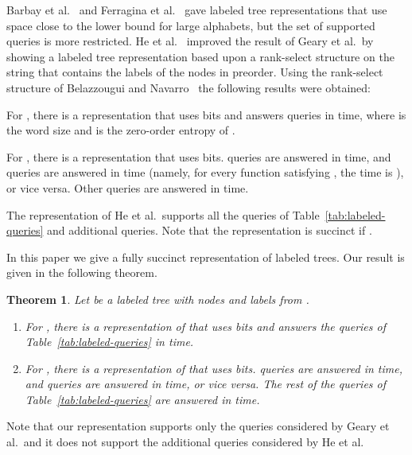 \documentclass[12pt]{article}
\newtheorem{theorem}{Theorem}
\begin{document}
Barbay et al.~\cite{BarbayGMR07} and Ferragina et al.~\cite{FerraginaLMM09}
gave labeled tree representations that use space close to the lower bound
for large alphabets,
but the set of supported queries is more restricted.
He et al.~\cite{HeMZ12} improved the result of Geary et al.\ by showing
a labeled tree representation based upon a rank-select structure on
the string  that contains the labels of the nodes in preorder.
Using the rank-select structure of Belazzougui and Navarro~\cite{BelazzouguiN12}
the following results were obtained:
\begin{inparaenum}[(1)]
\item
For , there is a representation that uses 
bits and answers queries in  time,
where  is the word size and
 is the zero-order entropy of .
\item
For , there is a representation that uses
 bits.
 queries are answered in  time,
and  queries are answered in  time
(namely, for every function  satisfying , the time is ), or vice versa. Other queries are answered in
 time.
\end{inparaenum}
The representation of He et al.\ supports all the queries of
Table~\ref{tab:labeled-queries} and additional queries.
Note that the representation is succinct if .

In this paper we give a fully succinct representation of labeled trees.
Our result is given in the following theorem.
\begin{theorem}
Let  be a labeled tree with  nodes and labels from .
\begin{enumerate}
\item
For , there is a representation of  that uses
 bits
and answers the queries of Table~\ref{tab:labeled-queries} in  time.
\item
For , there is a representation of  that
uses  bits.
 queries are answered in  time,
and  queries are answered in  time,
or vice versa.
The rest of the queries of Table~\ref{tab:labeled-queries} are answered in
 time.
\end{enumerate}
\end{theorem}
Note that our representation supports only the queries considered by
Geary et al.\ and it does not support the additional queries considered by He et al.
\end{document}
